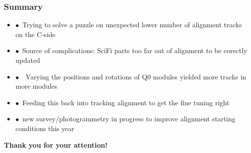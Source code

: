 \documentclass[aspectratio=1610, 12pt]{beamer}
\begin{document}

\begin{frame}\frametitle{Summary}
  \begin{itemize}
    \item $\bullet$\, Trying to solve a puzzle on unexpected lower number of alignment tracks on the C-side
    \item $\bullet$\, Source of complications: SciFi parts too far out of alignment to be corectly updated
    \item $\bullet$\, \to\, Varying the positions and rotations of Q0 modules yielded more tracks in more modules
    \item $\bullet$\, Feeding this back into tracking alignment to get the fine tuning right
    \item $\bullet$\, new survey/photogrammetry in progress to improve alignment starting conditions this year
  \end{itemize}
  \textbf{Thank you for your attention!}
\end{frame}

\end{document}
